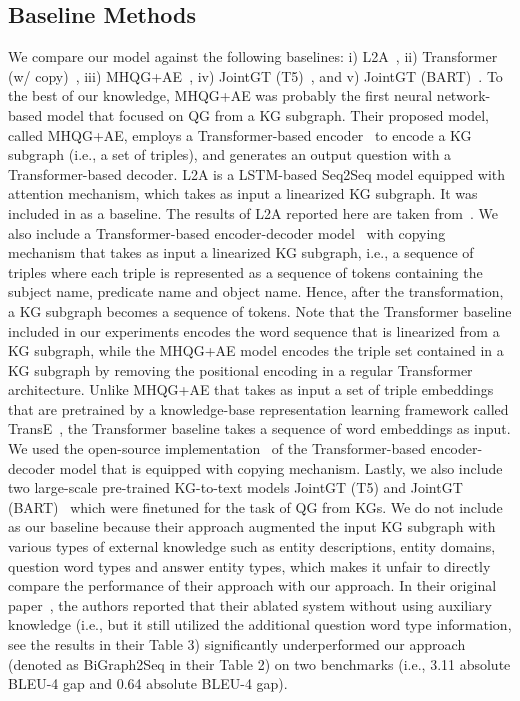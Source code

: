 \documentclass[journal]{IEEEtran}
\begin{document}
\subsection{Baseline Methods}

We compare our model against the following baselines:
i) L2A~\cite{du2017learning},
ii) Transformer (w/ copy)~\cite{vaswani2017attention},
iii) MHQG+AE~\cite{kumar2019difficulty},
iv) JointGT (T5)~\cite{ke2021joint},
and v) JointGT (BART)~\cite{ke2021joint}.
To the best of our knowledge, MHQG+AE was probably the first neural network-based model that focused on QG from a KG subgraph.
Their proposed model, called MHQG+AE, employs a Transformer-based encoder~\cite{vaswani2017attention} to encode a KG subgraph (i.e., a set of triples), and generates an output question with a Transformer-based decoder.
L2A is a LSTM-based Seq2Seq model equipped with attention mechanism, which takes as input a linearized KG subgraph.
It was included in \cite{kumar2019difficulty} as a baseline.
The results of L2A reported here are taken from~\cite{kumar2019difficulty}.
We also include a Transformer-based encoder-decoder model~\cite{klein2017opennmt} with copying mechanism that takes as input a linearized KG subgraph, i.e., a sequence of triples where each triple is represented as a sequence of tokens containing the subject name, predicate name and object name.
Hence, after the transformation, a KG subgraph becomes a sequence of tokens.
Note that the Transformer baseline included in our experiments encodes the word sequence that is linearized from a KG subgraph,
while the MHQG+AE model encodes the triple set contained in a KG subgraph by removing the positional encoding in a regular Transformer architecture.
Unlike MHQG+AE that takes as input a set of triple embeddings that are pretrained by a knowledge-base representation learning framework called TransE~\cite{bordes2013translating},
the Transformer baseline takes a sequence of word embeddings as input.
We used the open-source implementation~\cite{klein2017opennmt} of the Transformer-based encoder-decoder model that is equipped with copying mechanism.
Lastly, we also include two large-scale pre-trained KG-to-text models JointGT (T5) and JointGT (BART)~\cite{ke2021joint} which were finetuned for the task of QG from KGs. We do not include~\cite{sheng2020knowledge} as our baseline because their approach augmented the input KG subgraph with various types of external knowledge such as entity descriptions, entity domains, question word types and answer entity types, which makes it unfair to directly compare the performance of their approach with our approach. In their original paper~\cite{sheng2020knowledge}, the authors reported that their ablated system without using auxiliary knowledge (i.e., but it still utilized the additional question word type information, see the results in their Table 3) significantly underperformed our approach (denoted as BiGraph2Seq in their Table 2) on two benchmarks (i.e., 3.11 absolute BLEU-4 gap and 0.64 absolute BLEU-4 gap).
\end{document}
